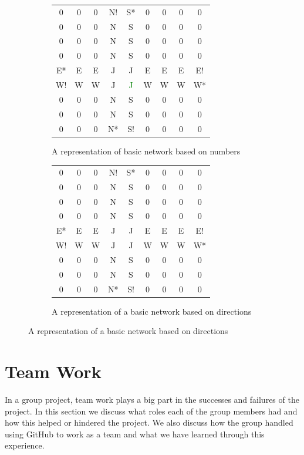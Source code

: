 \documentclass{article}
\begin{document}
\begin{figure}[H]
\begin{subfigure}{0.5\textwidth}
\begin{tabular}{ccccccccc}
0 & 0 & 0 & N! & S* & 0 & 0 & 0 & 0 \\
0 & 0 & 0 & N & S & 0 & 0 & 0 & 0\\
0 & 0 & 0 & N & S & 0 & 0 & 0 & 0 \\
0 & 0 & 0 & N & S & 0 & 0 & 0 & 0\\
E* & E & E & J & J & E & E & E & E!\\
W! & W & W & J & \textcolor{green}{J} & W & W & W & W*\\
0 & 0 & 0 & N & S & 0 & 0 & 0 & 0\\
0 & 0 & 0 & N & S & 0 & 0 & 0 & 0\\
0 & 0 & 0 & N* & S! & 0 & 0 & 0 & 0\\
\end{tabular} 
\caption{A representation of basic network based on numbers}
\label{NumberRepresentation}
\end{subfigure}
%
\qquad
\begin{subfigure}{0.50\textwidth}
\centering
\begin{tabular}{ccccccccc}
0 & 0 & 0 & N! & S* & 0 & 0 & 0 & 0 \\
0 & 0 & 0 & N & S & 0 & 0 & 0 & 0\\
0 & 0 & 0 & N & S & 0 & 0 & 0 & 0 \\
0 & 0 & 0 & N & S & 0 & 0 & 0 & 0\\
E* & E & E & J & J & E & E & E & E!\\
W! & W & W & J & J & W & W & W & W*\\
0 & 0 & 0 & N & S & 0 & 0 & 0 & 0\\
0 & 0 & 0 & N & S & 0 & 0 & 0 & 0\\
0 & 0 & 0 & N* & S! & 0 & 0 & 0 & 0\\
\end{tabular} 
\caption{A representation of a basic network based on directions}
\label{DirectionRepresentation}
\end{subfigure}
\label{ExampleNetwork}
\end{figure}


	
	\section{Team Work}
	In a group project, team work plays a big part in the successes and failures of the project. In this section we discuss what roles each of the group members had and how this helped or hindered the project. We also discuss how the group handled using GitHub to work as a team and what we have learned through this experience. 
	
\end{document}

